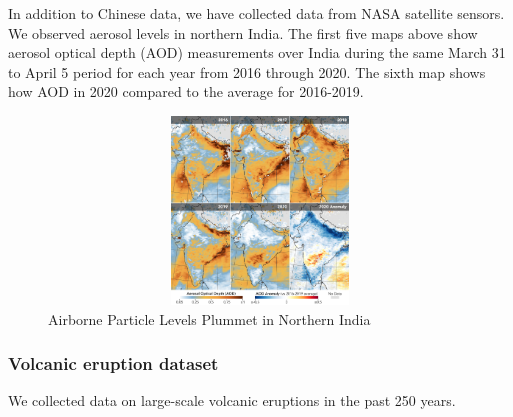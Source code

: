 \documentclass{apmcmthesis}
\begin{document}
 
In addition to Chinese data, we have collected data from NASA satellite sensors. 
We observed aerosol levels in northern India.\cite{india}
The first five maps above show aerosol optical depth (AOD) measurements over India during the same March 31 to April 5 period for each year from 2016 through 2020. The sixth map shows how AOD in 2020 compared to the average for 2016-2019.

\begin{figure}
    \centering
    \includegraphics[width=13cm,height=5cm]{APMCMThesis/figures/india.png}
    \caption{ Airborne Particle Levels Plummet in Northern India\cite{bib:two}}
\label{india}
\end{figure}

\subsubsection{Volcanic eruption dataset}
We collected data on large-scale volcanic eruptions in the past 250 years.
\end{document}
